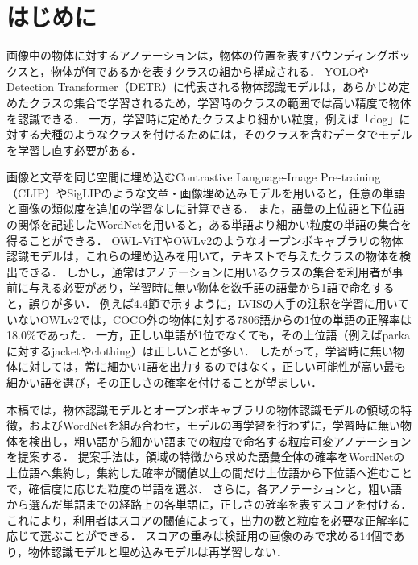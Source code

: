 \section{はじめに}
画像中の物体に対するアノテーションは，物体の位置を表すバウンディングボックスと，物体が何であるかを表すクラスの組から構成される．
YOLO\cite{ref_YOLO}やDetection Transformer（DETR）\cite{ref_DETR}に代表される物体認識モデルは，あらかじめ定めたクラスの集合で学習されるため，学習時のクラスの範囲では高い精度で物体を認識できる．
一方，学習時に定めたクラスより細かい粒度，例えば「dog」に対する犬種のようなクラスを付けるためには，そのクラスを含むデータでモデルを学習し直す必要がある．

画像と文章を同じ空間に埋め込むContrastive Language-Image Pre-training（CLIP）\cite{ref_CLIP}やSigLIP\cite{ref_SigLIP}のような文章・画像埋め込みモデルを用いると，任意の単語と画像の類似度を追加の学習なしに計算できる．
また，語彙の上位語と下位語の関係を記述したWordNet\cite{ref_WordNet}を用いると，ある単語より細かい粒度の単語の集合を得ることができる．
OWL-ViT\cite{ref_OWLViT}やOWLv2\cite{ref_OWLv2}のようなオープンボキャブラリの物体認識モデルは，これらの埋め込みを用いて，テキストで与えたクラスの物体を検出できる．
しかし，通常はアノテーションに用いるクラスの集合を利用者が事前に与える必要があり，学習時に無い物体を数千語の語彙から1語で命名すると，誤りが多い．
例えば4.4節で示すように，LVIS\cite{ref_LVIS}の人手の注釈を学習に用いていないOWLv2では，COCO外の物体に対する7806語からの1位の単語の正解率は18.0\%であった．
一方，正しい単語が1位でなくても，その上位語（例えばparkaに対するjacketやclothing）は正しいことが多い．
したがって，学習時に無い物体に対しては，常に細かい1語を出力するのではなく，正しい可能性が高い最も細かい語を選び，その正しさの確率を付けることが望ましい．

本稿では，物体認識モデルとオープンボキャブラリの物体認識モデルの領域の特徴，およびWordNetを組み合わせ，モデルの再学習を行わずに，学習時に無い物体を検出し，粗い語から細かい語までの粒度で命名する粒度可変アノテーションを提案する．
提案手法は，領域の特徴から求めた語彙全体の確率をWordNetの上位語へ集約し，集約した確率が閾値以上の間だけ上位語から下位語へ進むことで，確信度に応じた粒度の単語を選ぶ．
さらに，各アノテーションと，粗い語から選んだ単語までの経路上の各単語に，正しさの確率を表すスコアを付ける．
これにより，利用者はスコアの閾値によって，出力の数と粒度を必要な正解率に応じて選ぶことができる．
スコアの重みは検証用の画像のみで求める14個であり，物体認識モデルと埋め込みモデルは再学習しない．

